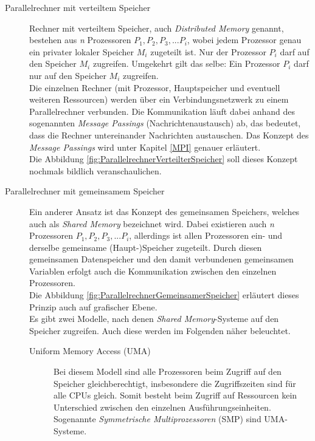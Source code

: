 				\begin{description}
					\item [Parallelrechner mit verteiltem Speicher]
						Rechner mit verteiltem Speicher, auch \textit{Distributed Memory} genannt, bestehen aus \textit{n} Prozessoren $P_1, P_2, P_3, ... P_i$, wobei jedem Prozessor genau ein privater lokaler Speicher $M_i$ zugeteilt ist. Nur der Prozessor $P_i$ darf auf den Speicher $M_i$ zugreifen. Umgekehrt gilt das selbe: Ein Prozessor $P_i$ darf nur auf den Speicher $M_i$ zugreifen.\\
						Die einzelnen Rechner (mit Prozessor, Hauptspeicher und eventuell weiteren Ressourcen) werden über ein Verbindungsnetzwerk zu einem Parallelrechner verbunden. Die Kommunikation läuft dabei anhand des sogenannten \textit{Message Passings} (Nachrichtenaustausch) ab, das bedeutet, dass die Rechner untereinander Nachrichten austauschen. Das Konzept des \textit{Message Passings} wird unter Kapitel \ref{MPI} genauer erläutert.\\
						Die Abbildung \ref{fig:ParallelrechnerVerteilterSpeicher} soll dieses Konzept nochmals bildlich veranschaulichen. \cite{EntwicklungParallelerProgramme}
						
					\item[Parallelrechner mit gemeinsamem Speicher]
						Ein anderer Ansatz ist das Konzept des gemeinsamen Speichers, welches auch als \textit{Shared Memory} bezeichnet wird. Dabei existieren auch \textit{n} Prozessoren $P_1, P_2, P_3, ... P_i$, allerdings ist allen Prozessoren ein- und derselbe gemeinsame (Haupt-)Speicher zugeteilt. Durch diesen gemeinsamen Datenspeicher und den damit verbundenen gemeinsamen Variablen erfolgt auch die Kommunikation zwischen den einzelnen Prozessoren.\\
						Die Abbildung \ref{fig:ParallelrechnerGemeinsamerSpeicher} erläutert dieses Prinzip auch auf grafischer Ebene.\\
						Es gibt zwei Modelle, nach denen \textit{Shared Memory}-Systeme auf den Speicher zugreifen. Auch diese werden im Folgenden näher beleuchtet. \cite{EntwicklungParallelerProgramme}
						
						\begin{description}
							\item [Uniform Memory Access (UMA)]
								Bei diesem Modell sind alle Prozessoren beim Zugriff auf den Speicher gleichberechtigt, insbesondere die Zugriffszeiten sind für alle CPUs gleich. Somit besteht beim Zugriff auf Ressourcen kein Unterschied zwischen den einzelnen Ausführungseinheiten.\\
								Sogenannte \textit{Symmetrische Multiprozessoren} (SMP) sind UMA-Systeme. \cite{EntwicklungParallelerProgramme}
								

\end{description}
\end{description}
